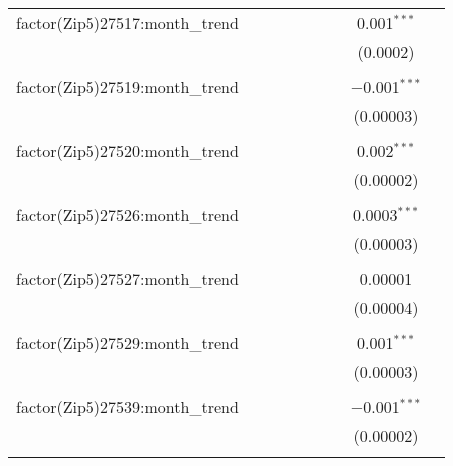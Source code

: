 \begin{table}[H]
{\begin{tabular}{@{\extracolsep{5pt}}lcccccccc}
  factor(Zip5)27517:month\_trend &  &  &  &  &  &  & 0.001$^{***}$ &  \\  

   &  &  &  &  &  &  & (0.0002) &  \\  

   & & & & & & & & \\  

  factor(Zip5)27519:month\_trend &  &  &  &  &  &  & $-$0.001$^{***}$ &  \\  

   &  &  &  &  &  &  & (0.00003) &  \\  

   & & & & & & & & \\  

  factor(Zip5)27520:month\_trend &  &  &  &  &  &  & 0.002$^{***}$ &  \\  

   &  &  &  &  &  &  & (0.00002) &  \\  

   & & & & & & & & \\  

  factor(Zip5)27526:month\_trend &  &  &  &  &  &  & 0.0003$^{***}$ &  \\  

   &  &  &  &  &  &  & (0.00003) &  \\  

   & & & & & & & & \\  

  factor(Zip5)27527:month\_trend &  &  &  &  &  &  & 0.00001 &  \\  

   &  &  &  &  &  &  & (0.00004) &  \\  

   & & & & & & & & \\  

  factor(Zip5)27529:month\_trend &  &  &  &  &  &  & 0.001$^{***}$ &  \\  

   &  &  &  &  &  &  & (0.00003) &  \\  

   & & & & & & & & \\  

  factor(Zip5)27539:month\_trend &  &  &  &  &  &  & $-$0.001$^{***}$ &  \\  

   &  &  &  &  &  &  & (0.00002) &  \\  

   & & & & & & & & \\  


\end{tabular}}
\end{table}
